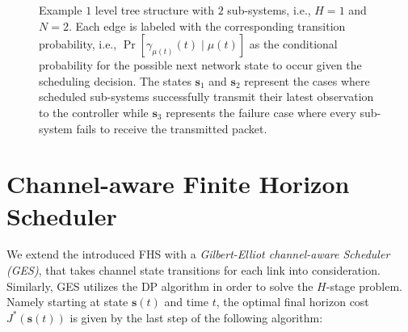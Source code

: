\begin{figure}[htb]
	\centering
  \resizebox{.8\columnwidth}{!}{} 
  \caption[FHS: Example tree structure with 2 sub-systems and finite horizon
  1]{Example $1$ level tree structure with $2$ sub-systems, i.e., $H=1$ and
  $N=2$. Each edge is labeled with the corresponding transition probability,
  i.e., $\Pr{[\gamma_{\mu(t)}(t)\mid \mu(t)]}$ as the conditional probability
  for the possible next network state to occur given the scheduling decision.
  The states $\textbf{s}_1$ and $\textbf{s}_2$ represent the cases where
  scheduled sub-systems successfully transmit their latest observation to the
  controller while $\textbf{s}_3$ represents the failure case where every
  sub-system fails to receive the transmitted packet.}
	\label{fig:FHStree}
\end{figure}

\section{Channel-aware Finite Horizon Scheduler} \label{sec:gescheduler}

We extend the introduced FHS with a \textit{Gilbert-Elliot channel-aware
Scheduler (GES)}, that takes channel state transitions for each link into
consideration. Similarly, GES utilizes the DP algorithm in order to solve the
$H$-stage problem. Namely starting at state $\boldsymbol{s}(t)$ and time $t$,
the optimal final horizon cost $J^*(\boldsymbol{s}(t))$ is given by the last
step of the following algorithm:


\begin{center}
\end{center}
  

